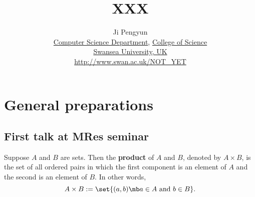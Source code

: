 \documentclass{report}
\begin{document}
\title{XXX}
\author{Ji Pengyun\\
  \href{http://www.swan.ac.uk/compsci/}{Computer Science Department}, \href{http://www.swan.ac.uk/science/}{College of Science}\\
   \href{http://www.swan.ac.uk/}{Swansea University, UK}\\
  {\small \url{http://www.swan.ac.uk/NOT_YET}}
}



\maketitle

\tableofcontents

\chapter{General preparations}
\label{cha:Generalpreparations}


\section{First talk at MRes seminar}
\label{sec:FirsttalkMRes}

\begin{defi}\label{def:cartesianprod}
  Suppose $A$ and $B$ are sets. Then the \textbf{product} of $A$ and $B$, denoted by $A \times B$, is the set of all ordered pairs in which the first component is an element of $A$ and the second is an element of $B$. In other words,
  \begin{displaymath}
    A \times B := \set{ (a,b) \mb a \in A \text{ and }  b \in B}.
  \end{displaymath}
\end{defi}
\end{document}
